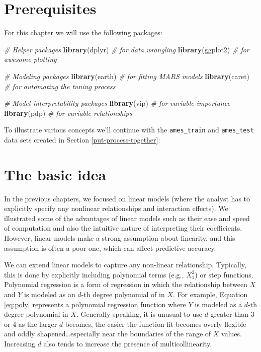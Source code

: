 \documentclass[]{krantz}
\makeatletter
\newenvironment{Shaded}{\begin{snugshade}}{\end{snugshade}}
\newcommand{\CommentTok}[1]{\textcolor[rgb]{0.37,0.37,0.37}{\textit{#1}}}
\newcommand{\KeywordTok}[1]{\textcolor[rgb]{0.27,0.27,0.27}{\textbf{#1}}}
\newcommand{\NormalTok}[1]{#1}
\newenvironment{kframe}{%
\medskip{}
\setlength{\fboxsep}{.8em}
 \def\at@end@of@kframe{}%
 \ifinner\ifhmode%
  \def\at@end@of@kframe{\end{minipage}}%
  \begin{minipage}{\columnwidth}%
 \fi\fi%
 \def\FrameCommand##1{\hskip\@totalleftmargin \hskip-\fboxsep
 \colorbox{shadecolor}{##1}\hskip-\fboxsep
     \hskip-\linewidth \hskip-\@totalleftmargin \hskip\columnwidth}%
 \MakeFramed {\advance\hsize-\width
   \@totalleftmargin\z@ \linewidth\hsize
   \@setminipage}}%
 {\par\unskip\endMakeFramed%
 \at@end@of@kframe}
\renewenvironment{Shaded}{\begin{kframe}}{\end{kframe}}
\makeatother
\begin{document}
\hypertarget{prerequisites-5}{%
\section{Prerequisites}\label{prerequisites-5}}

For this chapter we will use the following packages:

\begin{Shaded}
\begin{Highlighting}[]
\CommentTok{# Helper packages}
\KeywordTok{library}\NormalTok{(dplyr)     }\CommentTok{# for data wrangling}
\KeywordTok{library}\NormalTok{(ggplot2)   }\CommentTok{# for awesome plotting}

\CommentTok{# Modeling packages}
\KeywordTok{library}\NormalTok{(earth)     }\CommentTok{# for fitting MARS models}
\KeywordTok{library}\NormalTok{(caret)     }\CommentTok{# for automating the tuning process}

\CommentTok{# Model interpretability packages}
\KeywordTok{library}\NormalTok{(vip)       }\CommentTok{# for variable importance}
\KeywordTok{library}\NormalTok{(pdp)       }\CommentTok{# for variable relationships}
\end{Highlighting}
\end{Shaded}

To illustrate various concepts we'll continue with the \texttt{ames\_train} and \texttt{ames\_test} data sets created in Section \ref{put-process-together}:

\hypertarget{the-basic-idea}{%
\section{The basic idea}\label{the-basic-idea}}

In the previous chapters, we focused on linear models (where the analyst has to explicitly specify any nonlinear relationships and interaction effects). We illustrated some of the advantages of linear models such as their ease and speed of computation and also the intuitive nature of interpreting their coefficients. However, linear models make a strong assumption about linearity, and this assumption is often a poor one, which can affect predictive accuracy.

We can extend linear models to capture any non-linear relationship. Typically, this is done by explicitly including polynomial terms (e.g., \(X_1^2\)) or step functions. Polynomial regression is a form of regression in which the relationship between \(X\) and \(Y\) is modeled as an \(d\)-th degree polynomial of in \(X\). For example, Equation \eqref{eq:poly} represents a polynomial regression function where \(Y\) is modeled as a \(d\)-th degree polynomial in \(X\). Generally speaking, it is unusual to use \(d\) greater than 3 or 4 as the larger \(d\) becomes, the easier the function fit becomes overly flexible and oddly shapened\ldots{}especially near the boundaries of the range of \(X\) values. Increasing \(d\) also tends to increase the presence of multicollinearity.
\end{document}
